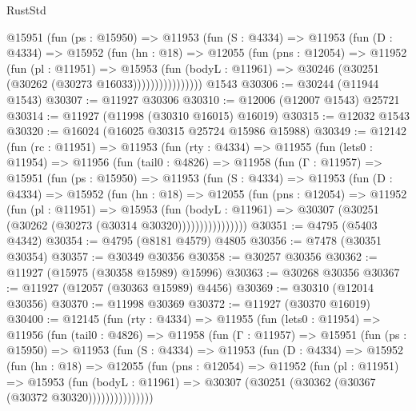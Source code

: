 \begin{lexlean}{RustStd}
\begin{coremodule}
              @15951
                (fun (ps : @15950) =>
                @11953
                  (fun (S : @4334) =>
                  @11953
                    (fun (D : @4334) =>
                    @15952
                      (fun (hn : @18) =>
                      @12055
                        (fun (pns : @12054) =>
                        @11952
                          (fun (pl : @11951) =>
                          @15953
                            (fun (bodyL : @11961) =>
                            @30246 (@30251 (@30262 (@30273 @16033))))))))))))))))
    @1543
@30306 := @30244 (@11944 @1543)
@30307 := @11927 @30306
@30310 := @12006 (@12007 @1543) @25721
@30314 := @11927 (@11998 (@30310 @16015) @16019)
@30315 := @12032 @1543
@30320 := @16024 (@16025 @30315 @25724 @15986 @15988)
@30349 := @12142
    (fun (rc : @11951) =>
    @11953
      (fun (rty : @4334) =>
      @11955
        (fun (lets0 : @11954) =>
        @11956
          (fun (tail0 : @4826) =>
          @11958
            (fun (Γ : @11957) =>
            @15951
              (fun (ps : @15950) =>
              @11953
                (fun (S : @4334) =>
                @11953
                  (fun (D : @4334) =>
                  @15952
                    (fun (hn : @18) =>
                    @12055
                      (fun (pns : @12054) =>
                      @11952
                        (fun (pl : @11951) =>
                        @15953
                          (fun (bodyL : @11961) =>
                          @30307 (@30251 (@30262 (@30273 (@30314 @30320))))))))))))))))
@30351 := @4795 (@5403 @4342)
@30354 := @4795 (@8181 @4579) @4805
@30356 := @7478 (@30351 @30354)
@30357 := @30349 @30356
@30358 := @30257 @30356
@30362 := @11927 (@15975 (@30358 @15989) @15996)
@30363 := @30268 @30356
@30367 := @11927 (@12057 (@30363 @15989) @4456)
@30369 := @30310 (@12014 @30356)
@30370 := @11998 @30369
@30372 := @11927 (@30370 @16019)
@30400 := @12145
    (fun (rty : @4334) =>
    @11955
      (fun (lets0 : @11954) =>
      @11956
        (fun (tail0 : @4826) =>
        @11958
          (fun (Γ : @11957) =>
          @15951
            (fun (ps : @15950) =>
            @11953
              (fun (S : @4334) =>
              @11953
                (fun (D : @4334) =>
                @15952
                  (fun (hn : @18) =>
                  @12055
                    (fun (pns : @12054) =>
                    @11952
                      (fun (pl : @11951) =>
                      @15953
                        (fun (bodyL : @11961) =>
                        @30307 (@30251 (@30362 (@30367 (@30372 @30320)))))))))))))))

\end{coremodule}
\end{lexlean}
